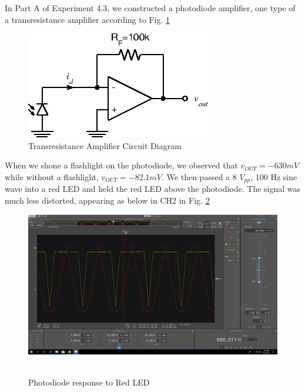 \documentclass[10pt]{article}
\begin{document}
\quad In Part A of Experiment 4.3, we constructed a photodiode amplifier, one type of a transresistance amplifier according to Fig. \ref{fig:transresistance}

\begin{centering}
	\begin{figure} [H]
		\centering
		\includegraphics[scale=0.75]{images/transresistanceamplifier.png}
		\caption{Transresistance Amplifier Circuit Diagram}
		\label{fig:transresistance}
	\end{figure}
\end{centering}

When we shone a flashlight on the photodiode, we observed that $v_{OUT} = -630mV$ while without a flashlight, $v_{OUT} = -82.1 mV$. We then passed a 8 $V_{pp}$, 100 Hz sine wave into a red LED and held the red LED above the photodiode. The signal was much less distorted, appearing as below in CH2 in Fig. \ref{fig:photodiode}

\begin{centering}
	\begin{figure} [H]
		\centering
		\includegraphics[scale=0.20]{images/photodiode.png}\
		\caption{Photodiode response to Red LED}
		\label{fig:photodiode}
	\end{figure}
\end{centering}
\end{document}
